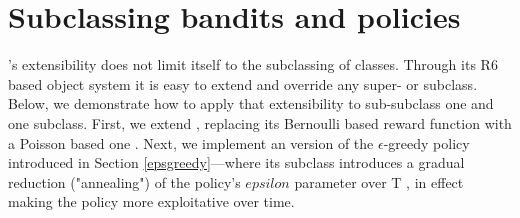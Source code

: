 \documentclass{jss}
\begin{document}
\section{Subclassing bandits and policies} \label{subclpb}

's extensibility does not limit itself to the subclassing of  classes. Through its R6 based object system it is easy to extend and override any  super- or subclass. Below, we demonstrate how to apply that extensibility to sub-subclass one  and one  subclass.
First, we extend , replacing its Bernoulli based reward function with a Poisson based one \citep{Presman1991}. Next, we implement an  version of the $\epsilon$-greedy policy introduced in Section \ref{epsgreedy}---where its  subclass introduces a gradual reduction ("annealing") of the policy's $epsilon$ parameter over T \citep{Cesa-Bianchi1998,Kirkpatrick1983}, in effect making the policy more exploitative over time.
\end{document}
